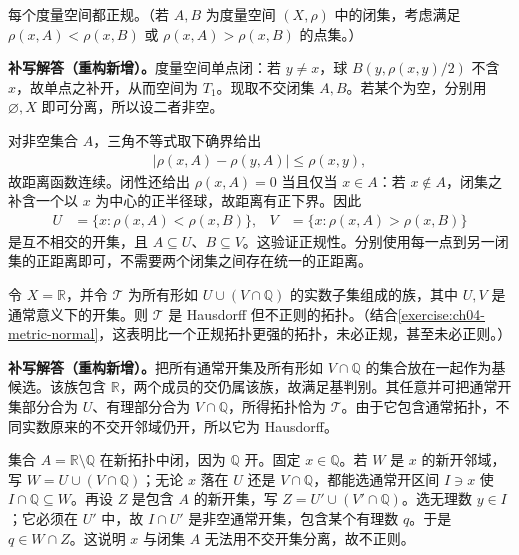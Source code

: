 \documentclass[../../main.tex]{subfiles}%
\begin{document}
\begin{exercise}\label{exercise:ch04-metric-normal}
每个度量空间都正规。（若 $A,B$ 为度量空间 $(X,\rho)$ 中的闭集，考虑满足 $\rho(x,A)<\rho(x,B)$ 或 $\rho(x,A)>\rho(x,B)$ 的点集。）
\end{exercise}
\begin{solution}
\textbf{补写解答（重构新增）。}度量空间单点闭：若 $y\ne x$，球 $B(y,\rho(x,y)/2)$ 不含 $x$，故单点之补开，从而空间为 $T_1$。现取不交闭集 $A,B$。若某个为空，分别用 $\varnothing,X$ 即可分离，所以设二者非空。

对非空集合 $A$，三角不等式取下确界给出
\begin{align*}
|\rho(x,A)-\rho(y,A)|\le\rho(x,y),
\end{align*}
故距离函数连续。闭性还给出 $\rho(x,A)=0$ 当且仅当 $x\in A$：若 $x\notin A$，闭集之补含一个以 $x$ 为中心的正半径球，故距离有正下界。因此
\begin{align*}
U&=\{x:\rho(x,A)<\rho(x,B)\}, &
V&=\{x:\rho(x,A)>\rho(x,B)\}
\end{align*}
是互不相交的开集，且 $A\subseteq U$、$B\subseteq V$。这验证正规性。分别使用每一点到另一闭集的正距离即可，不需要两个闭集之间存在统一的正距离。
\end{solution}
\begin{exercise}\label{exercise:ch04-rational-refinement}
令 $X=\mathbb R$，并令 $\mathcal T$ 为所有形如 $U\cup(V\cap\mathbb Q)$ 的实数子集组成的族，其中 $U,V$ 是通常意义下的开集。则 $\mathcal T$ 是 Hausdorff 但不正则的拓扑。（结合\cref{exercise:ch04-metric-normal}，这表明比一个正规拓扑更强的拓扑，未必正规，甚至未必正则。）
\end{exercise}
\begin{solution}
\textbf{补写解答（重构新增）。}把所有通常开集及所有形如 $V\cap\mathbb Q$ 的集合放在一起作为基候选。该族包含 $\mathbb R$，两个成员的交仍属该族，故满足基判别。其任意并可把通常开集部分合为 $U$、有理部分合为 $V\cap\mathbb Q$，所得拓扑恰为 $\mathcal T$。由于它包含通常拓扑，不同实数原来的不交开邻域仍开，所以它为 Hausdorff。

集合 $A=\mathbb R\setminus\mathbb Q$ 在新拓扑中闭，因为 $\mathbb Q$ 开。固定 $x\in\mathbb Q$。若 $W$ 是 $x$ 的新开邻域，写 $W=U\cup(V\cap\mathbb Q)$；无论 $x$ 落在 $U$ 还是 $V\cap\mathbb Q$，都能选通常开区间 $I\ni x$ 使 $I\cap\mathbb Q\subseteq W$。再设 $Z$ 是包含 $A$ 的新开集，写 $Z=U'\cup(V'\cap\mathbb Q)$。选无理数 $y\in I$；它必须在 $U'$ 中，故 $I\cap U'$ 是非空通常开集，包含某个有理数 $q$。于是 $q\in W\cap Z$。这说明 $x$ 与闭集 $A$ 无法用不交开集分离，故不正则。
\end{solution}
\end{document}
